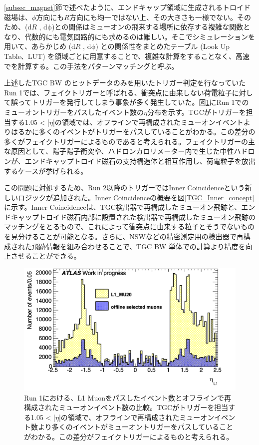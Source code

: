 \ref{subsec_magnet}節で述べたように、エンドキャップ領域に生成されるトロイド磁場は、$\phi$方向にも$R$方向にも均一ではない上、その大きさも一様でない。そのため、($\mathrm{d}R$ , $\mathrm{d\phi}$)と\pt の関係はミューオンの飛来する場所に依存する複雑な関数となり、代数的にも電気回路的にも求めるのは難しい。そこでシミュレーションを用いて、あらかじめ  ($\mathrm{d}R$ , $\mathrm{d\phi}$) と\pt の関係性をまとめたテーブル  (Look Up Table、LUT) を領域ごとに用意することで、複雑な計算をすることなく、高速で\pt を計算する。この手法をパターンマッチングと呼ぶ。

上述したTGC BW のヒットデータのみを用いたトリガー判定を行なっていたRun 1では、フェイクトリガーと呼ばれる、衝突点に由来しない荷電粒子に対して誤ってトリガーを発行してしまう事象が多く発生していた。図\ref{TGC_faketrigger}にRun 1でのミューオントリガーをパスしたイベント数の$\eta$分布を示す。TGCがトリガーを担当する1.05 < |$\eta$|の領域では、オフラインで再構成されたミューオンイベントよりはるかに多くのイベントがトリガーをパスしていることがわかる。この差分の多くがフェイクトリガーによるものであると考えられる。フェイクトリガーの主な原因として、陽子陽子衝突や、ハドロンカロリメーター内で生じた中性ハドロンが、エンドキャップトロイド磁石の支持構造体と相互作用し、荷電粒子を放出するケースが挙げられる。

この問題に対処するため、Run 2以降のトリガーではInner Coincidenceという新しいロジックが追加された。Inner Coincidenceの概要を図\ref{TGC_Inner_concept}に示す。Inner Coincidenceは、TGC検出器で再構成したミューオン飛跡と、エンドキャップトロイド磁石内部に設置された検出器で再構成したミューオン飛跡のマッチングをとるもので、これによって衝突点に由来する粒子とそうでないものを見分けることが可能となる。さらに、NSWなどの精密測定用の検出器で再構成された飛跡情報を組み合わせることで、TGC BW 単体での\pt 計算より精度を向上させることができる。


\begin{figure} 
\centering
\includegraphics[width=16cm]{fig/Intro/TGC_faketrigger.png}
\caption[Run-1での\pt 閾値]{Run 1における、L1 Muonをパスしたイベント数とオフラインで再構成されたミューオンイベント数の比較。TGCがトリガーを担当する1.05 < |$\eta$|の領域で、オフラインで再構成されたミューオンイベント数より多くのイベントがミューオントリガーをパスしていることがわかる。この差分がフェイクトリガーによるものと考えられる。}
\label{TGC_faketrigger}
\end{figure}

